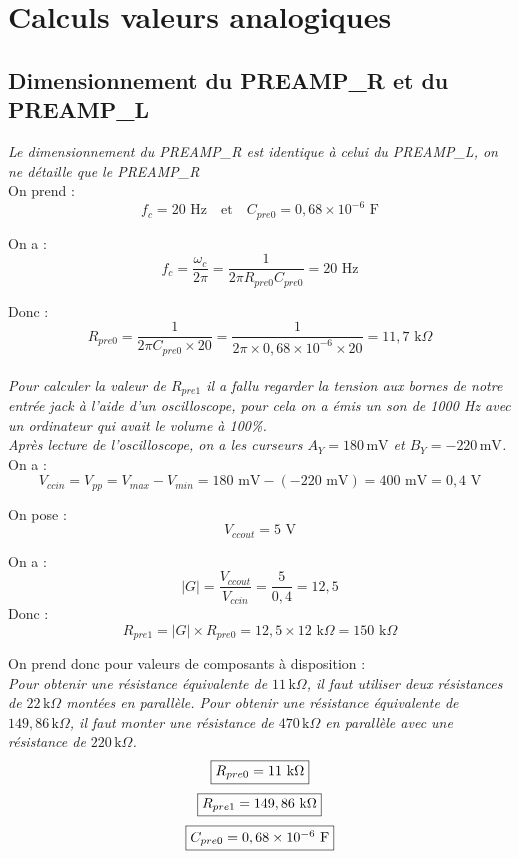 \documentclass{report}
\begin{document}
\newpage

\chapter{Calculs valeurs analogiques}

\section{Dimensionnement du PREAMP\_R et du PREAMP\_L}
\textit{Le dimensionnement du PREAMP\_R est identique à celui du PREAMP\_L, on ne détaille que le PREAMP\_R}
\\

On prend :
\[f_c = 20 \text{ Hz} \quad \text{et} \quad C_{pre0} = 0,68 \times 10^{-6} \text{ F}
\]

On a :
\[ f_c = \frac{\omega_c}{2\pi} = \frac{1}{2\pi R_{pre0} C_{pre0}} = 20 \text{ Hz}
\]

Donc : 
\[ R_{pre0} = \frac{1}{2\pi C_{pre0} \times 20} = \frac{1}{2\pi \times 0,68 \times 10^{-6} \times 20} = 11,7 \text{ k}\Omega
\]
\\

\textit{Pour calculer la valeur de \(R_{pre1}\) il a fallu regarder la tension aux bornes de notre entrée jack à l'aide d'un oscilloscope, pour cela on a émis un son de 1000 Hz avec un ordinateur qui avait le volume à 100\%. \\ 
Après lecture de l'oscilloscope, on a les curseurs \(A_Y = 180\,\text{mV}\) et \(B_Y = -220\,\text{mV}\).}
\\

On a : 
\[ V_{ccin} = V_{pp} = V_{max} - V_{min} = 180 \text{ mV} - (-220 \text{ mV}) = 400 \text{ mV} = 0,4 \text{ V}
\]

On pose : 
\[V_{ccout} = 5 \text{ V}\]

On a : 
\[|G| = \frac{V_{ccout}}{V_{ccin}} = \frac{5}{0,4} = 12,5 
\]
Donc : 
\[ R_{pre1} = |G| \times R_{pre0} = 12,5 \times 12 \text{ k}\Omega = 150 \text{ k}\Omega
\]

On prend donc pour valeurs de composants à disposition : 
\\

\textit{Pour obtenir une résistance équivalente de \(11\,\mathrm{k}\Omega\), il faut utiliser deux résistances de \(22\,\mathrm{k}\Omega\) montées en parallèle. Pour obtenir une résistance équivalente de \(149{,}86\,\mathrm{k}\Omega\), il faut monter une résistance de \(470\,\mathrm{k}\Omega\) en parallèle avec une résistance de \(220\,\mathrm{k}\Omega\).}
\[
\fbox{$R_{pre0} = 11 \text{ k}\Omega$}
\]
\[\fbox{$R_{pre1} = 149,86 \text{ k}\Omega$} 
\]
\[
\fbox{$C_{pre0} = 0,68 \times 10^{-6} \text{ F}$}
\]
\end{document}
